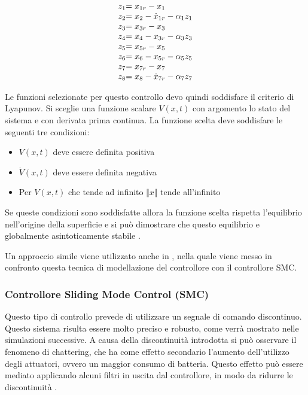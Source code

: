 \begin{equation}\label{eq:SistemaQuadrirotore-BACKERR}
	\begin{array}{r@{}l}
		z_1 & = x_{1r} -x_1 \\
		z_2 & = x_2 - \dot{x}_{1r} - \alpha_1 z_1 \\
		z_3 & = x_{3r} - x_3 \\
		z_4 & = x_4 - x_{3r} - \alpha_3 z_3 \\
		z_5 & = x_{5r} -x_5 \\
		z_6 & = x_6 - x_{5r} - \alpha_5 z_5 \\
		z_7 &= x_{7r} - x_7 \\
		z_8 &= x_8 - \dot{x}_{7r} - \alpha_7 z_7
	\end{array}
\end{equation}

Le funzioni selezionate per questo controllo devo quindi soddisfare il criterio di Lyapunov. Si sceglie una funzione scalare $V(x,t)$ con argomento lo stato del sistema e con derivata prima continua. La funzione scelta deve soddisfare le seguenti tre condizioni:
\begin{itemize}
	\item $V(x,t)$ deve essere definita positiva
	\item $\dot{V}(x,t)$ deve essere definita negativa
	\item Per $V(x,t)$ che tende ad infinito $\Vert x \Vert$ tende all'infinito
\end{itemize}
Se queste condizioni sono soddisfatte allora la funzione scelta rispetta l'equilibrio nell'origine della superficie e si può dimostrare che questo equilibrio e globalmente asintoticamente stabile \cite{DesTestCarm}.

Un approccio simile viene utilizzato anche in \cite{Backstepping1}, nella quale viene messo in confronto questa tecnica di modellazione del controllore con il controllore SMC.

\subsubsection{Controllore Sliding Mode Control (SMC)}

Questo tipo di controllo prevede di utilizzare un segnale di comando discontinuo. Questo sistema risulta essere molto preciso e robusto, come verrà mostrato nelle simulazioni successive. A causa della discontinuità introdotta si può  osservare il fenomeno di chattering, che ha come effetto secondario l'aumento dell'utilizzo degli attuatori, ovvero un maggior consumo di batteria. Questo effetto può essere mediato applicando alcuni filtri in uscita dal controllore, in modo da ridurre le discontinuità \cite{KimJinho2020ACSo}. 


